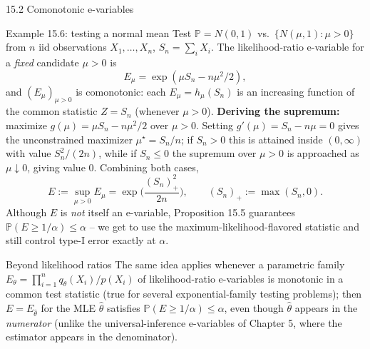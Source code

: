 \documentclass[aspectratio=169,10pt]{beamer}
\newcommand{\PP}{\mathbb{P}}
\begin{document}
\begin{frame}[allowframebreaks]{15.2 Comonotonic e-variables}
  \begin{exampleblock}{Example 15.6: testing a normal mean}
    Test $\PP=N(0,1)$ vs.\ $\{N(\mu,1):\mu>0\}$ from $n$ iid observations $X_1,\dots,X_n$, $S_n=\sum_i X_i$. The likelihood-ratio e-variable for a \emph{fixed} candidate $\mu>0$ is
    \[
      E_\mu = \exp(\mu S_n - n\mu^2/2), \tag{Eq.~15.1}
    \]
    and $(E_\mu)_{\mu>0}$ is comonotonic: each $E_\mu = h_\mu(S_n)$ is an increasing function of the common statistic $Z=S_n$ (whenever $\mu>0$). \textbf{Deriving the supremum:} maximize $g(\mu)=\mu S_n - n\mu^2/2$ over $\mu>0$. Setting $g'(\mu)=S_n-n\mu=0$ gives the unconstrained maximizer $\mu^\star=S_n/n$; if $S_n>0$ this is attained inside $(0,\infty)$ with value $S_n^2/(2n)$, while if $S_n\le0$ the supremum over $\mu>0$ is approached as $\mu\downarrow0$, giving value $0$. Combining both cases,
    \[
      E := \sup_{\mu>0}E_\mu = \exp\!\Big(\frac{(S_n)_+^2}{2n}\Big), \qquad (S_n)_+ := \max(S_n,0).
    \]
    Although $E$ is \emph{not} itself an e-variable, Proposition 15.5 guarantees $\PP(E\ge1/\alpha)\le\alpha$ -- we get to use the maximum-likelihood-flavored statistic and still control type-I error exactly at $\alpha$.
  \end{exampleblock}

  \begin{block}{Beyond likelihood ratios}
    The same idea applies whenever a parametric family $E_\theta=\prod_{i=1}^n q_\theta(X_i)/p(X_i)$ of likelihood-ratio e-variables is monotonic in a common test statistic (true for several exponential-family testing problems); then $E=E_{\hat\theta}$ for the MLE $\hat\theta$ satisfies $\PP(E\ge1/\alpha)\le\alpha$, even though $\hat\theta$ appears in the \emph{numerator} (unlike the universal-inference e-variables of Chapter 5, where the estimator appears in the denominator).
  \end{block}
\end{frame}
\end{document}
